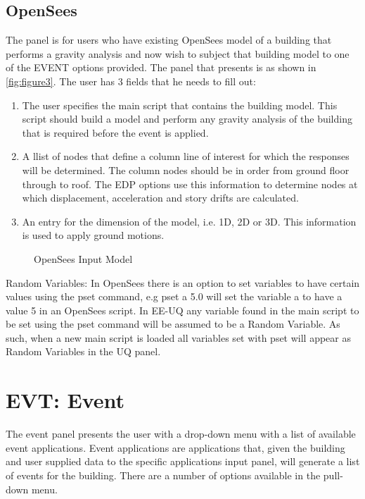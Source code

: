 \subsection{OpenSees}
The panel is for users who have existing OpenSees model of a building that performs a gravity analysis and now wish to subject that building model to one of the EVENT options provided. The panel that presents is as shown in \autoref{fig:figure3}. The user has 3 fields that he needs to fill out:
\begin{enumerate} 
\item The user specifies the main script that contains the building model. This script should build a model and perform any gravity analysis of the building that is required before the event is applied.
\item A llist of nodes that define a column line of interest for which the responses will be determined. The column nodes should be in order from ground floor through to roof. The EDP options use this information to determine nodes at which displacement, acceleration and story drifts are calculated. 
\item An entry for the dimension of the model, i.e. 1D, 2D or 3D. This information is used to apply ground motions.
\end{enumerate}

\begin{figure}[!htbp]
  \caption{OpenSees Input Model}
  \label{fig:figure3}
\end{figure}

Random Variables: In OpenSees there is an option to set variables to have certain values using the pset command, e.g pset a 5.0 will set the variable a to have a value 5 in an OpenSees script. In EE-UQ any variable found in the main script to be set using the pset command will be assumed to be a Random Variable. As such, when a new main script is loaded all variables set with pset will appear as Random Variables in the UQ panel.


\section{EVT: Event}
The event panel presents the user with a drop-down menu with a list of available event applications. Event applications are applications that, given the building and user supplied data to the specific
applications input panel, will generate a list of events for the building. There are a number of options available in the pull-down menu.


